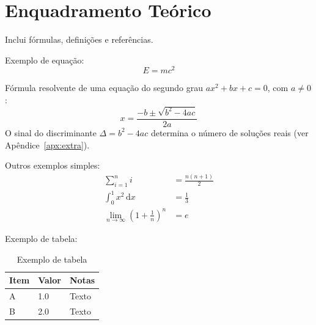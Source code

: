 \section{Enquadramento Teórico}
\label{sec:background}

Inclui fórmulas, definições e referências.

Exemplo de equação:
\begin{equation}
  E = mc^2
\end{equation}

Fórmula resolvente de uma equação do segundo grau $ax^2 + bx + c = 0$, com $a \neq 0$:
\begin{equation}
  x = \frac{-b \pm \sqrt{b^2 - 4ac}}{2a}
  \label{eq:resolvente}
\end{equation}
O sinal do discriminante $\Delta = b^2 - 4ac$ determina o número de soluções reais (ver Apêndice~\ref{apx:extra}).

Outros exemplos simples:
\begin{align}
  \sum_{i=1}^{n} i &= \frac{n(n+1)}{2} \\
  \int_0^1 x^2 \, \mathrm{d}x &= \frac{1}{3} \\
  \lim_{n \to \infty} \left(1 + \frac{1}{n}\right)^n &= e
\end{align}

Exemplo de tabela:
\begin{table}[H]
  \centering
  \caption{Exemplo de tabela}
  \begin{tabular}{@{}lll@{}}
    \toprule
    \textbf{Item} & \textbf{Valor} & \textbf{Notas} \\
    \midrule
    A & 1.0 & Texto \\
    B & 2.0 & Texto \\
    \bottomrule
  \end{tabular}
\end{table}
